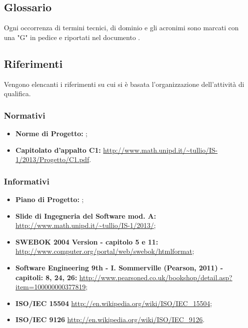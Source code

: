 \subsection{Glossario}
Ogni occorrenza di termini tecnici, di dominio e gli acronimi sono marcati con una "G" in pedice e riportati nel documento \Glossario{}.

\subsection{Riferimenti}
Vengono elencanti i riferimenti su cui si è basata l'organizzazione dell'attività di qualifica.
	\subsubsection{Normativi}
		\begin{itemize}
  			\item \textbf{Norme di Progetto:}  \NormeDiProgetto;
			\item \textbf{Capitolato d'appalto C1:} \url{http://www.math.unipd.it/~tullio/IS-1/2013/Progetto/C1.pdf}.
		\end{itemize}
	\subsubsection{Informativi}
		\begin{itemize}
  			\item \textbf{Piano di Progetto:} \PianoDiProgetto{};
  			\item \textbf{Slide di Ingegneria del Software mod. A:} \url{http://www.math.unipd.it/~tullio/IS-1/2013/};
  			\item \textbf{SWEBOK 2004 Version - capitolo 5 e 11:} \url{http://www.computer.org/portal/web/swebok/htmlformat}; 
  			\item \textbf{Software Engineering 9th - I. Sommerville (Pearson, 2011) - capitoli: 8, 24, 26:} \url{http://www.pearsoned.co.uk/bookshop/detail.asp?item=100000000377819};
  			\item \textbf{ISO/IEC 15504} \url{http://en.wikipedia.org/wiki/ISO/IEC_15504};
			\item \textbf{ISO/IEC 9126} \url{http://en.wikipedia.org/wiki/ISO/IEC_9126}.
		\end{itemize}
	

